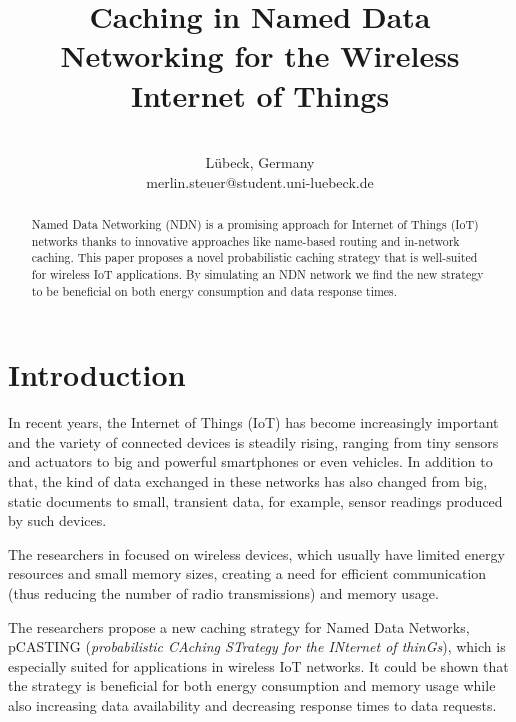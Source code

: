\documentclass[conference]{IEEEtran}
\begin{document}
\title{Caching in Named Data Networking for the Wireless Internet of Things}

\author{
\\
Lübeck, Germany \\
merlin.steuer@student.uni-luebeck.de
}

\maketitle

\begin{abstract}
Named Data Networking (NDN) is a promising approach for Internet of Things (IoT) networks thanks to innovative approaches like name-based routing and in-network caching. This paper proposes a novel probabilistic caching strategy that is well-suited for wireless IoT applications. By simulating an NDN network we find the new strategy to be beneficial on both energy consumption and data response times.
\end{abstract}


\section{Introduction}

In recent years, the Internet of Things (IoT) has become increasingly important and the variety of connected devices is steadily rising, ranging from tiny sensors and actuators to big and powerful smartphones or even vehicles. In addition to that, the kind of data exchanged in these networks has also changed from big, static documents to small, transient data, for example, sensor readings produced by such devices.

The researchers in \cite{Hail2015} focused on wireless devices, which usually have limited energy resources and small memory sizes, creating a need for efficient communication (thus reducing the number of radio transmissions) and memory usage.

The researchers propose a new caching strategy for Named Data Networks, {pCASTING} (\textit{probabilistic {CAching} STrategy for the {INternet} of {thinGs}}), which is especially suited for applications in wireless IoT networks. It could be shown that the strategy is beneficial for both energy consumption and memory usage while also increasing data availability and decreasing response times to data requests.
\end{document}
